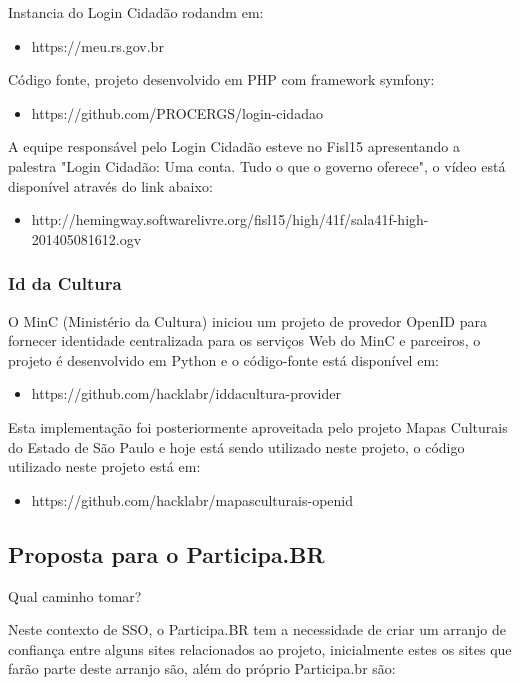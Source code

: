 \documentclass[11pt]{article}
\begin{document}
Instancia do Login Cidadão rodandm em:
\begin{itemize}
  \item{https://meu.rs.gov.br}
\end{itemize}

Código fonte, projeto desenvolvido em PHP com framework symfony:
\begin{itemize}
  \item{https://github.com/PROCERGS/login-cidadao}
\end{itemize}

A equipe responsável pelo Login Cidadão esteve no Fisl15 apresentando a
palestra "Login Cidadão: Uma conta. Tudo o que o governo oferece", o vídeo
está disponível através do link abaixo:
\begin{itemize}
  \item{http://hemingway.softwarelivre.org/fisl15/high/41f/sala41f-high-201405081612.ogv}
\end{itemize}

\subsubsection{Id da Cultura}

O MinC (Ministério da Cultura) iniciou um projeto de provedor OpenID para
fornecer identidade centralizada para os serviços Web do MinC e parceiros, o
projeto é desenvolvido em Python e o código-fonte está disponível em:
\begin{itemize}
  \item{https://github.com/hacklabr/iddacultura-provider}
\end{itemize}

Esta implementação foi posteriormente aproveitada pelo projeto Mapas Culturais
do Estado de São Paulo e hoje está sendo utilizado neste projeto, o código
utilizado neste projeto está em:
\begin{itemize}
  \item{https://github.com/hacklabr/mapasculturais-openid}
\end{itemize}

\subsection{Proposta para o Participa.BR}

Qual caminho tomar?

Neste contexto de SSO, o Participa.BR tem a necessidade de criar um
arranjo de confiança entre alguns sites relacionados ao projeto, inicialmente
estes os sites que farão parte deste arranjo são, além do próprio Participa.br
são:
\end{document}

